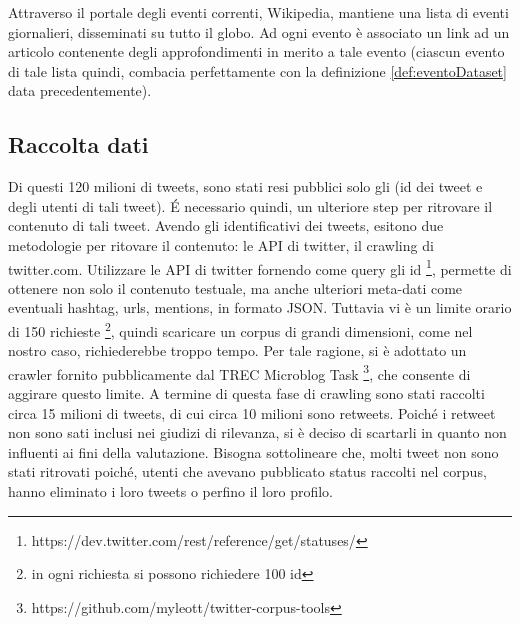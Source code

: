 Attraverso il portale degli eventi correnti, Wikipedia, mantiene una lista di eventi giornalieri, disseminati su tutto il globo. Ad ogni evento è associato un link ad un articolo contenente degli approfondimenti in merito a tale evento (ciascun evento di tale lista quindi, combacia perfettamente con la definizione \ref {def:eventoDataset} data precedentemente).

 

\subsection{Raccolta dati}
Di questi 120 milioni di tweets, sono stati resi pubblici solo gli (id dei tweet e degli utenti di tali tweet).  \'E necessario quindi, un ulteriore step per ritrovare il contenuto di tali tweet.
Avendo gli identificativi dei tweets, esitono due metodologie per ritovare il contenuto: le API di twitter, il crawling di twitter.com.
Utilizzare le API di twitter fornendo come query gli id \footnote{https://dev.twitter.com/rest/reference/get/statuses/}, permette di ottenere non solo il contenuto testuale, ma anche ulteriori meta-dati come eventuali hashtag, urls, mentions, in formato JSON.
Tuttavia vi è un limite orario di 150 richieste \footnote{in ogni richiesta si possono richiedere 100 id}, quindi scaricare un corpus di grandi dimensioni, come nel nostro caso, richiederebbe troppo tempo. Per tale ragione, si è adottato un crawler fornito pubblicamente dal TREC Microblog Task \footnote{https://github.com/myleott/twitter-corpus-tools}, che consente di aggirare questo limite. A termine di questa fase di crawling sono stati raccolti circa 15 milioni di tweets, di cui  circa 10 milioni  sono retweets. Poiché i retweet non sono sati inclusi nei giudizi di rilevanza, si è deciso di scartarli in quanto non influenti ai fini della valutazione. Bisogna sottolineare che,  molti tweet non sono stati ritrovati poiché, utenti che avevano pubblicato status raccolti nel corpus, hanno eliminato i loro tweets o perfino il loro profilo.



